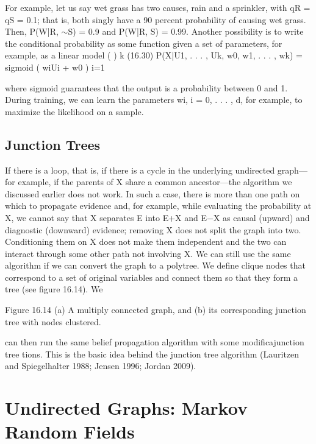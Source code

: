 For example, let us say wet grass has two causes, rain and a sprinkler, with qR = qS = 0.1; that is, both singly have a 90 percent probability of causing wet grass. Then, P(W|R, $\sim$S) = 0.9 and P(W|R, S) = 0.99. Another possibility is to write the conditional probability as some function given a set of parameters, for example, as a linear model ( ) k (16.30) P(X|U1, . . . , Uk, w0, w1, . . . , wk) = sigmoid ( wiUi + w0 ) i=1

where sigmoid guarantees that the output is a probability between 0 and 1. During training, we can learn the parameters wi, i = 0, . . . , d, for example, to maximize the likelihood on a sample.

\subsection{Junction Trees}

If there is a loop, that is, if there is a cycle in the underlying undirected graph---for example, if the parents of X share a common ancestor---the algorithm we discussed earlier does not work. In such a case, there is more than one path on which to propagate evidence and, for example, while evaluating the probability at X, we cannot say that X separates E into E+X and E$-$X as causal (upward) and diagnostic (downward) evidence; removing X does not split the graph into two. Conditioning them on X does not make them independent and the two can interact through some other path not involving X. We can still use the same algorithm if we can convert the graph to a polytree. We define clique nodes that correspond to a set of original variables and connect them so that they form a tree (see figure 16.14). We

Figure 16.14 (a) A multiply connected graph, and (b) its corresponding junction tree with nodes clustered.

can then run the same belief propagation algorithm with some modificajunction tree tions. This is the basic idea behind the junction tree algorithm (Lauritzen and Spiegelhalter 1988; Jensen 1996; Jordan 2009).

\section{Undirected Graphs: Markov Random Fields}

